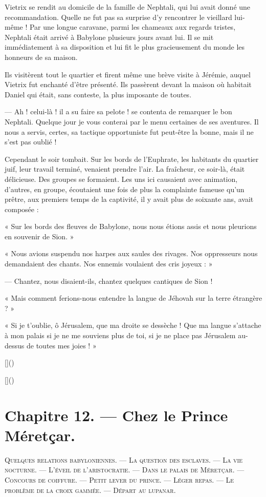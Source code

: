 \documentclass[a4paper, 11pt, oneside, polutonikogreek, french]{article}
\begin{document}
Vietrix se rendit au domicile de la famille de Nephtali, qui lui avait donné une recommandation. Quelle ne fut pas sa surprise d'y rencontrer le vieillard lui-même ! Par une longue caravane, parmi les chameaux aux regards tristes, Nephtali était arrivé à Babylone plusieurs jours avant lui. Il se mit immédiatement à sa disposition et lui fit le plus gracieusement du monde les honneurs de sa maison.

Ils visitèrent tout le quartier et firent même une brève visite à Jérémie, auquel Vietrix fut enchanté d'être présenté. Ils passèrent devant la maison où habitait Daniel qui était, sans conteste, la plus imposante de toutes.

--- Ah ! celui-là ! il a su faire sa pelote ! se contenta de remarquer le bon Nephtali. Quelque jour je vous conterai par le menu certaines de ses aventures. Il nous a servis, certes, sa tactique opportuniste fut peut-être la bonne, mais il ne s'est pas oublié !

Cependant le soir tombait. Sur les bords de l'Euphrate, les habitants du quartier juif, leur travail terminé, venaient prendre l'air. La fraîcheur, ce soir-là, était délicieuse. Des groupes se formaient. Les uns ici causaient avec animation, d'autres, en groupe, écoutaient une fois de plus la complainte fameuse qu'un prêtre, aux premiers temps de la captivité, il y avait plus de soixante ans, avait composée :

« Sur les bords des fleuves de Babylone, nous nous étions assis et nous pleurions en souvenir de Sion. »

« Nous avions suspendu nos harpes aux saules des rivages. Nos oppresseurs nous demandaient des chants. Nos ennemis voulaient des cris joyeux : »

--- Chantez, nous disaient-ils, chantez quelques cantiques de Sion !

« Mais comment ferions-nous entendre la langue de Jéhovah sur la terre étrangère ? »

« Si je t'oublie, ô Jérusalem, que ma droite se dessèche ! Que ma langue s'attache à mon palais si je ne me souviens plus de toi, si je ne place pas Jérusalem au-dessus de toutes mes joies ! »

[]()

[]()
\clearpage
\section{Chapitre 12. --- Chez le Prince Méretçar.}
\begin{center}
\scshape
\small
Quelques relations babyloniennes. --- La question des esclaves. --- La vie nocturne. --- L'éveil de l'aristocratie. --- Dans le palais de Méretçar. --- Concours de coiffure. --- Petit lever du prince. --- Léger repas. --- Le problème de la croix gammée. --- Départ au lupanar.
\end{center}
\end{document}
